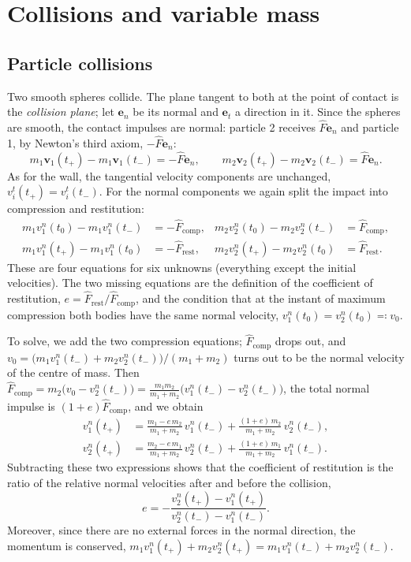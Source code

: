 \documentclass[11pt,a4paper,oneside]{report}
\numberwithin{equation}{chapter}
\newcommand{\vect}[1]{\bm{#1}}
\newcommand{\e}[1]{\vect{e}_{#1}}
\theoremstyle{plain}
\theoremstyle{definition}
\theoremstyle{remark}
\begin{document}
\section{Collisions and variable mass}
\subsection{Particle collisions}
Two smooth spheres collide. The plane tangent to both at the point of contact is the \emph{collision plane}; let
$\e n$ be its normal and $\e t$ a direction in it. Since the spheres are smooth, the contact impulses are normal:
particle 2 receives $\hat F\e n$ and particle 1, by Newton's third axiom, $-\hat F\e n$:
\[
  m_1\vect v_1(t_+)-m_1\vect v_1(t_-)=-\hat F\e n,\qquad m_2\vect v_2(t_+)-m_2\vect v_2(t_-)=\hat F\e n .
\]
As for the wall, the tangential velocity components are unchanged, $v_i^t(t_+)=v_i^t(t_-)$. For the normal components
we again split the impact into compression and restitution:
\begin{align*}
  m_1v_1^n(t_0)-m_1v_1^n(t_-)&=-\hat F_{\text{comp}}, & m_2v_2^n(t_0)-m_2v_2^n(t_-)&=\hat F_{\text{comp}},\\
  m_1v_1^n(t_+)-m_1v_1^n(t_0)&=-\hat F_{\text{rest}}, & m_2v_2^n(t_+)-m_2v_2^n(t_0)&=\hat F_{\text{rest}}.
\end{align*}
These are four equations for six unknowns (everything except the initial velocities). The two missing equations
are the definition of the coefficient of restitution, $e=\hat F_{\text{rest}}/\hat F_{\text{comp}}$, and the
condition that at the instant of maximum compression both bodies have the same normal velocity,
$v_1^n(t_0)=v_2^n(t_0)\eqqcolon v_0$.

To solve, we add the two compression equations; $\hat F_{\text{comp}}$ drops out, and
$v_0=\big(m_1v_1^n(t_-)+m_2v_2^n(t_-)\big)/(m_1+m_2)$ turns out to be the normal velocity of the centre of mass.
Then $\hat F_{\text{comp}}=m_2\big(v_0-v_2^n(t_-)\big)=\frac{m_1m_2}{m_1+m_2}\big(v_1^n(t_-)-v_2^n(t_-)\big)$, the total
normal impulse is $(1+e)\hat F_{\text{comp}}$, and we obtain
\begin{align}
  v_1^n(t_+)&=\frac{m_1-e\,m_2}{m_1+m_2}\,v_1^n(t_-)+\frac{(1+e)\,m_2}{m_1+m_2}\,v_2^n(t_-),\\
  v_2^n(t_+)&=\frac{m_2-e\,m_1}{m_1+m_2}\,v_2^n(t_-)+\frac{(1+e)\,m_1}{m_1+m_2}\,v_1^n(t_-).
\end{align}
Subtracting these two expressions shows that the coefficient of restitution is the ratio of the relative normal
velocities after and before the collision,
\begin{equation}
  e=-\frac{v_2^n(t_+)-v_1^n(t_+)}{v_2^n(t_-)-v_1^n(t_-)} .
\end{equation}
Moreover, since there are no external forces in the normal direction, the momentum is conserved,
$m_1v_1^n(t_+)+m_2v_2^n(t_+)=m_1v_1^n(t_-)+m_2v_2^n(t_-)$.
\end{document}
